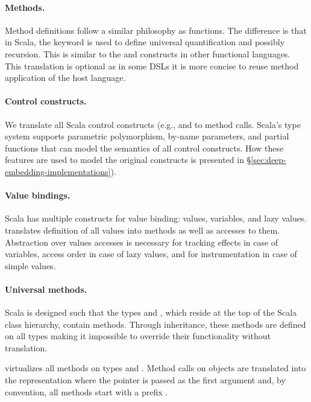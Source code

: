  \paragraph{Methods.} Method definitions follow a similar philosophy as functions.
  The difference is that in Scala, the  keyword is used to define universal quantification and possibly recursion.
  This is similar to the  and  constructs in other functional languages. This translation is optional
  as in some DSLs it is more concise to reuse method application of the host language.


 \paragraph{Control constructs.} We translate all Scala control constructs (e.g., and  to method calls.
  Scala's type system supports parametric polymorphism, by-name parameters, and partial functions that can model
  the semantics of all control constructs. How these features are used to model the original constructs is presented in \S \ref{sec:deep-embedding-implementations}).

 \paragraph{Value bindings.} Scala has multiple constructs for value binding: values, variables, and lazy values. \yy translates
  definition of all values into methods as well as accesses to them. Abstraction over values accesses is
  necessary for tracking effects in case of variables, access order in case of lazy values, and for instrumentation
  in case of simple values.

 \paragraph{Universal methods.} Scala is designed such that the types  and
 , which reside at the top of the Scala class hierarchy, contain
  methods. Through inheritance, these methods are defined on all
 types making it impossible to override their functionality without translation.

 \yy virtualizes all methods on types  and . Method calls on objects
  are translated into the representation where the  pointer is passed as the first argument and, by convention, all methods start
  with a prefix .

